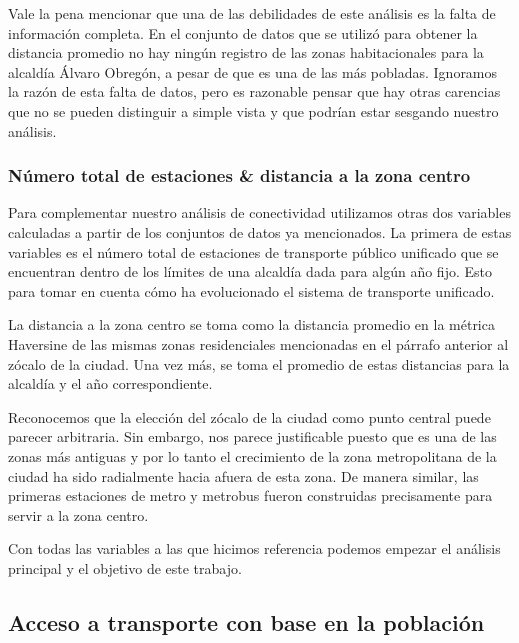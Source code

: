 \documentclass[
  spanish,
]{article}
\begin{document}
Vale la pena mencionar que una de las debilidades de este análisis es la
falta de información completa. En el conjunto de datos que se utilizó
para obtener la distancia promedio no hay ningún registro de las zonas
habitacionales para la alcaldía Álvaro Obregón, a pesar de que es una de
las más pobladas. Ignoramos la razón de esta falta de datos, pero es
razonable pensar que hay otras carencias que no se pueden distinguir a
simple vista y que podrían estar sesgando nuestro análisis.

\hypertarget{nuxfamero-total-de-estaciones-distancia-a-la-zona-centro}{%
\subsubsection{Número total de estaciones \& distancia a la zona
centro}\label{nuxfamero-total-de-estaciones-distancia-a-la-zona-centro}}

Para complementar nuestro análisis de conectividad utilizamos otras dos
variables calculadas a partir de los conjuntos de datos ya mencionados.
La primera de estas variables es el número total de estaciones de
transporte público unificado que se encuentran dentro de los límites de
una alcaldía dada para algún año fijo. Esto para tomar en cuenta cómo ha
evolucionado el sistema de transporte unificado.

La distancia a la zona centro se toma como la distancia promedio en la
métrica Haversine de las mismas zonas residenciales mencionadas en el
párrafo anterior al zócalo de la ciudad. Una vez más, se toma el
promedio de estas distancias para la alcaldía y el año correspondiente.

Reconocemos que la elección del zócalo de la ciudad como punto central
puede parecer arbitraria. Sin embargo, nos parece justificable puesto
que es una de las zonas más antiguas y por lo tanto el crecimiento de la
zona metropolitana de la ciudad ha sido radialmente hacia afuera de esta
zona. De manera similar, las primeras estaciones de metro y metrobus
fueron construidas precisamente para servir a la zona centro.

Con todas las variables a las que hicimos referencia podemos empezar el
análisis principal y el objetivo de este trabajo.

\hypertarget{acceso-a-transporte-con-base-en-la-poblaciuxf3n}{%
\subsection{Acceso a transporte con base en la
población}\label{acceso-a-transporte-con-base-en-la-poblaciuxf3n}}
\end{document}

